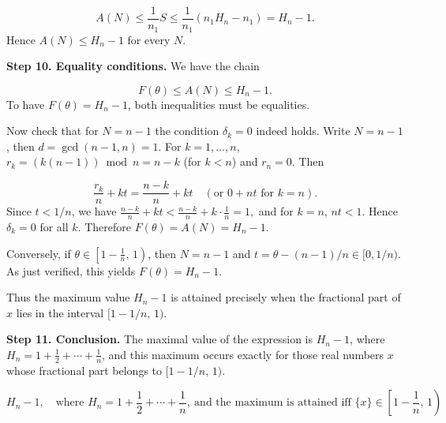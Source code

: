 \[
A(N) \le \frac{1}{n_1} S \le \frac{1}{n_1}(n_1 H_n - n_1) = H_n - 1.
\]
Hence \(A(N) \le H_n - 1\) for every \(N\).\par
\textbf{Step 10. Equality conditions.} We have the chain\par
\[
F(\theta) \le A(N) \le H_n - 1.
\]
To have \(F(\theta) = H_n - 1\), both inequalities must be equalities.\par
{}
Now check that for \(N = n-1\) the condition \(\delta_k = 0\) indeed holds. Write \(N = n-1\), then \(d = \gcd(n-1,n)=1\). For \(k=1,\dots,n\), \(r_k = (k(n-1)) \bmod n = n - k\) (for \(k<n\)) and \(r_n = 0\). Then\par
\[
\frac{r_k}{n} + kt = \frac{n - k}{n} + k t \quad (\text{or } 0 + n t \text{ for } k=n).
\]
Since \(t < 1/n\), we have \(\frac{n - k}{n} + k t < \frac{n - k}{n} + k \cdot \frac{1}{n} = 1,\) and for \(k=n\), \(n t < 1\). Hence \(\delta_k = 0\) for all \(k\). Therefore \(F(\theta) = A(N) = H_n - 1\).\par
Conversely, if \(\theta \in \left[1 - \frac1n,\, 1\right)\), then \(N = n-1\) and \(t = \theta - (n-1)/n \in [0,1/n)\). As just verified, this yields \(F(\theta) = H_n - 1\).\par
Thus the maximum value \(H_n - 1\) is attained precisely when the fractional part of \(x\) lies in the interval \([1 - 1/n,\, 1)\).\par
\textbf{Step 11. Conclusion.} The maximal value of the expression is \(H_n - 1\), where \(H_n = 1 + \frac12 + \cdots + \frac1n\), and this maximum occurs exactly for those real numbers \(x\) whose fractional part belongs to \([1 - 1/n,\, 1)\).\par
\[
\boxed{H_n - 1,\quad \text{where } H_n = 1 + \frac{1}{2} + \cdots + \frac{1}{n},\ \text{and the maximum is attained iff } \{x\} \in \left[1 - \frac{1}{n},\, 1\right)}
\]
\par
